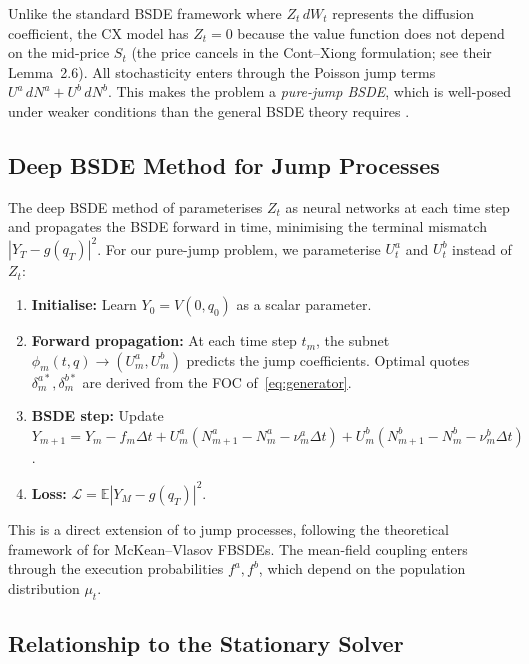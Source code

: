 \begin{remark}
Unlike the standard BSDE framework where $Z_t\,dW_t$ represents the
diffusion coefficient, the CX model has $Z_t = 0$ because the value
function does not depend on the mid-price $S_t$ (the price cancels
in the Cont--Xiong formulation; see their Lemma~2.6). All stochasticity
enters through the Poisson jump terms $U^a\,dN^a + U^b\,dN^b$. This
makes the problem a \emph{pure-jump BSDE}, which is well-posed under
weaker conditions than the general BSDE theory requires
\cite{tang1994}.
\end{remark}

\subsection{Deep BSDE Method for Jump Processes}

The deep BSDE method of \citet{han2018} parameterises $Z_t$ as neural
networks at each time step and propagates the BSDE forward in time,
minimising the terminal mismatch $|Y_T - g(q_T)|^2$. For our
pure-jump problem, we parameterise $U^a_t$ and $U^b_t$ instead of
$Z_t$:

\begin{enumerate}
  \item \textbf{Initialise:} Learn $Y_0 = V(0, q_0)$ as a scalar parameter.
  \item \textbf{Forward propagation:} At each time step $t_m$, the subnet
        $\phi_m(t, q) \to (U^a_m, U^b_m)$ predicts the jump coefficients.
        Optimal quotes $\delta^{a*}_m, \delta^{b*}_m$ are derived from the
        FOC of~\eqref{eq:generator}.
  \item \textbf{BSDE step:} Update $Y_{m+1} = Y_m - f_m \Delta t +
        U^a_m (N^a_{m+1} - N^a_m - \nu^a_m \Delta t) +
        U^b_m (N^b_{m+1} - N^b_m - \nu^b_m \Delta t)$.
  \item \textbf{Loss:} $\mathcal{L} = \mathbb{E}|Y_M - g(q_T)|^2$.
\end{enumerate}

This is a direct extension of \citet{han2018} to jump processes,
following the theoretical framework of \citet{han2022} for
McKean--Vlasov FBSDEs. The mean-field coupling enters through the
execution probabilities $f^a, f^b$, which depend on the population
distribution $\mu_t$.

\subsection{Relationship to the Stationary Solver}

